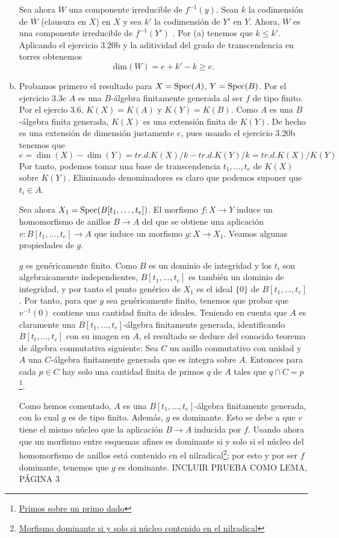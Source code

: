 \documentclass[twoside]{article}
\begin{document}
\begin{solucion}
\begin{enumerate}[(a)]
Sea ahora $W$ una componente irreducible de $f^{-1}(y)$. Sean $k$ la codimensión de $\overline{W}$ (clausura en $X$) en $X$ y sea $k'$ la codimensión de $Y'$ en $Y$. Ahora, $\overline{W}$ es una componente irreducible de $f^{-1}(Y')$ . Por (a) tenemos que $k\leq k'$. Aplicando el ejercicio 3.20b y la aditividad del grado de transcendencia en torres obtenemos
\[
\text{dim}(W)=e+k'-k \geq e.
\]
\item Probamos primero el resultado para $X=\operatorname{Spec}(A)$, $Y=\operatorname{Spec}(B)$. Por el ejercicio 3.3c $A$ es una $B$-álgebra finitamente generada al ser $f$ de tipo finito. Por el ejercio 3.6, $K(X)=K(A)$ y $K(Y)=K(B)$. Como $A$ es una $B$-álgebra finita generada, $K(X)$ es una extensión finita de $K(Y)$. De hecho es una extensión de dimensión justamente $e$, pues usando el ejercicio 3.20b tenemos que
\[
e=\dim(X)-\dim(Y)=tr.d. K(X)/k-tr.d. K(Y)/k=tr.d. K(X)/K(Y)
\]
Por tanto, podemos tomar una base de transcendencia $t_1,\dots, t_e$ de $K(X)$ sobre $K(Y)$. Eliminando denominadores es claro que podemos suponer que $t_i\in A$. 

Sea ahora $X_1=\operatorname{Spec}(B[t_1,\dots, t_e])$. El morfismo $f:X\to Y$ induce un homomorfismo de anillos $B\to A$ del que se obtiene una aplicación $v:B[t_1,\dots, t_e]\to A$ que induce un morfismo $g:X\to X_1$. Veamos algunas propiedades de $g$.

$g$ es genéricamente finito. Como $B$ es un dominio de integridad y los $t_i$ son algebraicamente independientes, $B[t_1,\dots, t_e]$ es también un dominio de integridad, y por tanto el punto genérico de $X_1$ es el ideal $\{0\}$ de $B[t_1,\dots, t_e]$. Por tanto, para que $g$ sea genéricamente finito, tenemos que probar que $v^{-1}(0)$ contiene una cantidad finita de ideales. Teniendo en cuenta que $A$ es claramente una $B[t_1,\dots, t_e]$-álgebra finitamente generada, identificando $B[t_t,\dots, t_e]$ con su imagen en $A$, el resultado se deduce del conocido teorema de álgebra conmutativa siguiente: Sea $C$ un anillo conmutativo con unidad y $A$ una $C$-álgebra finitamente generada que es íntegra sobre $A$. Entonces para cada $p\in C$ hay solo una cantidad finita de primos $q$ de $A$ tales que $q\cap C=p$\footnote{\href{https://math.stackexchange.com/questions/753042/finitely-many-prime-ideals-lying-over-mathfrakp}{Primos sobre un primo dado}}.

Como hemos comentado, $A$ es una $B[t_1,\dots, t_e]$-álgebra finitamente generada, con lo cual $g$ es de tipo finito. Además, $g$ es dominante. Esto se debe a que $v$ tiene el mismo núcleo que la aplicación $B\to A$ inducida por $f$. Usando ahora que un morfismo entre esquemas afines es dominante si y solo si el núcleo del homomorfismo de anillos está contenido en el nilradical\footnote{\href{https://math.stackexchange.com/questions/389036/dominant-morphism-between-affine-varieties-induces-injection-on-coordinate-rings}{Morfismo dominante si y solo si núcleo contenido en el nilradical}}; por esto y por ser $f$ dominante, tenemos que $g$ es dominante. INCLUIR PRUEBA COMO LEMA, PÁGINA 3


\end{enumerate}
\end{solucion}
\end{document}
